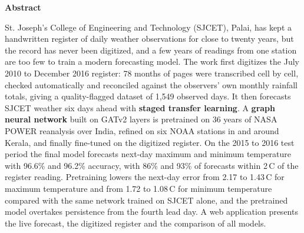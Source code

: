 \newpage
\thispagestyle{empty}
\begin{center}
  \vspace*{1cm}
  \textbf{\large Abstract}
\end{center}

\noindent
St. Joseph's College of Engineering and Technology (SJCET), Palai, has kept a handwritten register of daily weather observations for close to twenty years, but the record has never been digitized, and a few years of readings from one station are too few to train a modern forecasting model. The work first digitizes the July 2010 to December 2016 register: 78 months of pages were transcribed cell by cell, checked automatically and reconciled against the observers' own monthly rainfall totals, giving a quality-flagged dataset of 1,549 observed days. It then forecasts SJCET weather six days ahead with \textbf{staged transfer learning}. A \textbf{graph neural network} built on GATv2 layers is pretrained on 36 years of NASA POWER reanalysis over India, refined on six NOAA stations in and around Kerala, and finally fine-tuned on the digitized register. On the 2015 to 2016 test period the final model forecasts next-day maximum and minimum temperature with 96.6\% and 96.2\% accuracy, with 86\% and 93\% of forecasts within 2\,\textdegree C of the register reading. Pretraining lowers the next-day error from 2.17 to 1.43\,\textdegree C for maximum temperature and from 1.72 to 1.08\,\textdegree C for minimum temperature compared with the same network trained on SJCET alone, and the pretrained model overtakes persistence from the fourth lead day. A web application presents the live forecast, the digitized register and the comparison of all models.







{\renewcommand{\baselinestretch}{0.94}\normalsize\tableofcontents}\setcounter{tocdepth}{2}

{\renewcommand{\baselinestretch}{1.05}\normalsize\setlength{\nomitemsep}{-\parsep}\printnomenclature[3.2cm]}
\listoffigures

\listoftables

\newpage

\clearpage
{}
